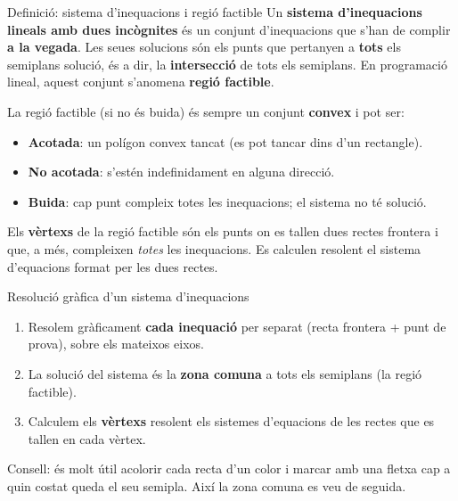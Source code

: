 \documentclass[11pt,a4paper]{article}
\newcommand{\fmbadge}[2]{\tcbox[on line,colback=#1,colframe=#1,arc=2mm,boxsep=0pt,left=4pt,right=4pt,top=1.5pt,bottom=1.5pt]{\color{white}\footnotesize\bfseries #2}}
\begin{document}
\begin{fmdef}{Definició: sistema d'inequacions i regió factible}
Un \textbf{sistema d'inequacions lineals amb dues incògnites} és un conjunt d'inequacions que s'han de complir \textbf{a la vegada}. Les seues solucions són els punts que pertanyen a \textbf{tots} els semiplans solució, és a dir, la \textbf{intersecció} de tots els semiplans. En programació lineal, aquest conjunt s'anomena \textbf{regió factible}.

La regió factible (si no és buida) és sempre un conjunt \textbf{convex} i pot ser:

\begin{itemize}
\item \fmbadge{fmok}{$\bullet$} \textbf{Acotada}: un polígon convex tancat (es pot tancar dins d'un rectangle).
\item \fmbadge{fmsf}{$\bullet$} \textbf{No acotada}: s'estén indefinidament en alguna direcció.
\item \fmbadge{fmas}{$\bullet$} \textbf{Buida}: cap punt compleix totes les inequacions; el sistema no té solució.
\end{itemize}

Els \textbf{vèrtexs} de la regió factible són els punts on es tallen dues rectes frontera i que, a més, compleixen \emph{totes} les inequacions. Es calculen resolent el sistema d'equacions format per les dues rectes.
\end{fmdef}

\begin{fmdef}{Resolució gràfica d'un sistema d'inequacions}
\begin{enumerate}
\item Resolem gràficament \textbf{cada inequació} per separat (recta frontera + punt de prova), sobre els mateixos eixos.
\item La solució del sistema és la \textbf{zona comuna} a tots els semiplans (la regió factible).
\item Calculem els \textbf{vèrtexs} resolent els sistemes d'equacions de les rectes que es tallen en cada vèrtex.
\end{enumerate}

\begin{fmnote}Consell: és molt útil acolorir cada recta d'un color i marcar amb una fletxa cap a quin costat queda el seu semipla. Així la zona comuna es veu de seguida.\end{fmnote}
\end{fmdef}
\end{document}
